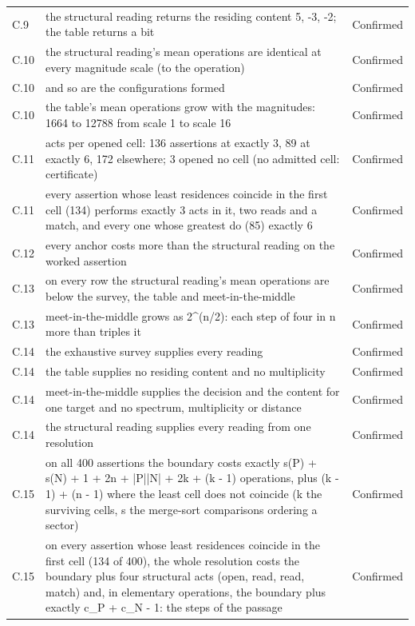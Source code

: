 \documentclass[pdflatex,sn-mathphys-num]{sn-jnl}
\theoremstyle{thmstyleone}%
\theoremstyle{thmstyletwo}%
\theoremstyle{thmstylethree}%
\begin{document}
\begin{appendices}
\begin{longtable}{@{} p{} p{} p{} @{}}
C.9 & the structural reading returns the residing content {5, -3, -2}; the table returns a bit & Confirmed \\
C.10 & the structural reading's mean operations are identical at every magnitude scale (to the operation) & Confirmed \\
C.10 & and so are the configurations formed & Confirmed \\
C.10 & the table's mean operations grow with the magnitudes: 1664 to 12788 from scale 1 to scale 16 & Confirmed \\
C.11 & acts per opened cell: 136 assertions at exactly 3, 89 at exactly 6, 172 elsewhere; 3 opened no cell (no admitted cell: certificate) & Confirmed \\
C.11 & every assertion whose least residences coincide in the first cell (134) performs exactly 3 acts in it, two reads and a match, and every one whose greatest do (85) exactly 6 & Confirmed \\
C.12 & every anchor costs more than the structural reading on the worked assertion & Confirmed \\
C.13 & on every row the structural reading's mean operations are below the survey, the table and meet-in-the-middle & Confirmed \\
C.13 & meet-in-the-middle grows as 2\^{}(n/2): each step of four in n more than triples it & Confirmed \\
C.14 & the exhaustive survey supplies every reading & Confirmed \\
C.14 & the table supplies no residing content and no multiplicity & Confirmed \\
C.14 & meet-in-the-middle supplies the decision and the content for one target and no spectrum, multiplicity or distance & Confirmed \\
C.14 & the structural reading supplies every reading from one resolution & Confirmed \\
C.15 & on all 400 assertions the boundary costs exactly s(P) + s(N) + 1 + 2n + |P||N| + 2k + (k - 1) operations, plus (k - 1) + (n - 1) where the least cell does not coincide (k the surviving cells, s the merge-sort comparisons ordering a sector) & Confirmed \\
C.15 & on every assertion whose least residences coincide in the first cell (134 of 400), the whole resolution costs the boundary plus four structural acts (open, read, read, match) and, in elementary operations, the boundary plus exactly c\_P + c\_N - 1: the steps of the passage & Confirmed \\

\end{longtable}
\end{appendices}
\end{document}
